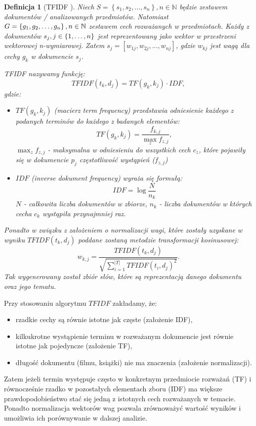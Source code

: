 \documentclass[12pt,a4paper]{report}
\newtheorem{df}{Definicja}[chapter]
\newcommand{\set}[1]{\left\lbrace {#1} \right\rbrace}
\newcommand{\setN}{\mathbb{N}}
\begin{document}
\begin{df}[TFIDF {\citep[Sec 3.3.1.1]{rsh}}]
Niech $ S = \set{s_1, s_2, \ldots ,s_n}, n\in \setN$ będzie zestawem dokumentów / analizowanych przedmiotów. Natomiast 
$G = \set{g_1, g_2, \ldots ,g_n}, \\ n\in \setN $ zestawem cech rozważanych w przedmiotach. Każdy z dokumentów $s_j, \\ j\in\set{1,\ldots,n} $ jest reprezentowany jako wektor w przestrzeni wektorowej n-wymiarowej. Zatem $ s_j = [w_{1j}, w_{2j},...,w_{nj}] $, gdzie $ w_{kj} $ jest wagą dla cechy $ g_k $ w dokumencie  $ s_j $.

TFIDF nazywamy funkcję:
$$
TFIDF(t_k, d_j) = TF(g_k, k_j) \cdot IDF,
$$
gdzie:
\begin{itemize}
\item $TF(g_k, k_j) $ (macierz \textit{term frequency}) przedstawia odniesienie każdego z podanych terminów do każdego z badanych elementów:
$$
TF(g_k, k_j)=\frac{f_{k,j}}{\max_{z}f_{z,j}},
$$
$\max_{z}f_{z,j}$ - maksymalna w odniesieniu do wszystkich cech $c_z$, które pojawiły się w dokumencie $p_j$ częstotliwość wystąpień ($f_{z,j}$) 

\item $IDF$ (\textit{inverse dokument frequency}) wyraża się formułą:
$$
IDF = \log \frac{N}{n_k}
$$
$N$ - całkowita liczba dokumentów w zbiorze,
$n_k$ - liczba dokumentów w których cecha $c_k$ wystąpiła przynajmniej raz.
\end{itemize}
Ponadto w związku z założeniem o normalizacji wagi, które zostały uzyskane w wyniku 
$TFIDF(t_k, d_j)$ poddane zostaną metodzie transformacji kosinusowej: 
$$
w_{k,j} = \frac{TFIDF(t_k, d_j)}{\sqrt{ \sum_{i=1}^{|T|}{TFIDF(t_i, d_j)}^2}}.
$$
Tak wygenerowany został zbiór słów, które są reprezentacją danego dokumentu oraz jego tematu.
\end{df}

Przy stosowaniu algorytmu $TFIDF$ zakładamy, że:
\begin{itemize}
\item rzadkie cechy są równie istotne jak częste (założenie IDF),
\item kilkukrotne wystąpienie terminu w rozważanym dokumencie jest równie istotne jak pojedyncze (założenie TF),
\item długość dokumentu (filmu, książki) nie ma znaczenia (założenie normalizacji).  
\end{itemize}
Zatem jeżeli termin występuje często w konkretnym przedmiocie rozważań (TF) i równocześnie rzadko w pozostałych elementach zboru (IDF) ma większe prawdopodobieństwo stać się jedną z istotnych cech rozważanych w temacie. Ponadto normalizacja wektorów wag pozwala zrównoważyć wartość wyników i umożliwia ich porównywanie w dalszej analizie.
\end{document}

